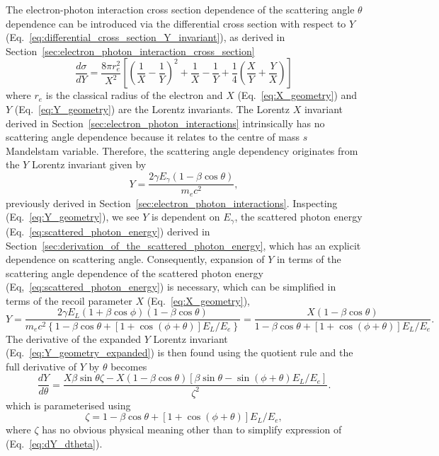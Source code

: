 \documentclass[../main.tex]{subfiles}
\begin{document}
The electron-photon interaction cross section dependence of the scattering angle $\theta$ dependence can be introduced via the differential cross section with respect to $Y$ (Eq.~\ref{eq:differential_cross_section_Y_invariant}), as derived in Section~\ref{sec:electron_photon_interaction_cross_section}
\begin{equation*}
\frac{d\sigma}{dY} = \frac{8\pi r_{e}^{2}}{X^{2}}\left[\left(\frac{1}{X}-\frac{1}{Y}\right)^{2}+\frac{1}{X}-\frac{1}{Y}+\frac{1}{4}\left(\frac{X}{Y}+\frac{Y}{X}\right)\right]
\end{equation*}
where $r_{e}$ is the classical radius of the electron and $X$ (Eq.~\ref{eq:X_geometry}) and $Y$ (Eq.~\ref{eq:Y_geometry}) are the Lorentz invariants. The Lorentz $X$ invariant derived in Section~\ref{sec:electron_photon_interactions} intrinsically has no scattering angle dependence because it relates to the centre of mass $s$ Mandelstam variable. Therefore, the scattering angle dependency originates from the $Y$ Lorentz invariant given by
\begin{equation*}
Y = \frac{2\gamma E_{\gamma}\left(1-\beta\cos\theta\right)}{m_{e}c^{2}},    
\end{equation*}
previously derived in Section~\ref{sec:electron_photon_interactions}. Inspecting (Eq.~\ref{eq:Y_geometry}), we see $Y$ is dependent on $E_{\gamma}$, the scattered photon energy (Eq.~\ref{eq:scattered_photon_energy}) derived in Section~\ref{sec:derivation_of_the_scattered_photon_energy}, which has an explicit dependence on scattering angle. Consequently, expansion of $Y$ in terms of the scattering angle dependence of the scattered photon energy (Eq,~\ref{eq:scattered_photon_energy}) is necessary, which can be simplified in terms of the recoil parameter $X$ (Eq.~\ref{eq:X_geometry}),
\begin{equation}
Y = \frac{2\gamma E_{L}\left(1+\beta\cos\phi\right)\left(1-\beta\cos\theta\right)}{m_{e}c^{2}\left\{1-\beta\cos\theta+\left[1+\cos\left(\phi+\theta\right)\right]E_{L}/E_{e}\right\}} = \frac{X\left(1-\beta\cos\theta\right)}{1-\beta\cos\theta+\left[1+\cos\left(\phi+\theta\right)\right]E_{L}/E_{e}}.
\label{eq:Y_geometry_expanded}
\end{equation}
The derivative of the expanded $Y$ Lorentz invariant (Eq.~\ref{eq:Y_geometry_expanded}) is then found using the quotient rule and the full derivative of $Y$ by $\theta$ becomes
\begin{equation}
\frac{dY}{d\theta} = \frac{X\beta\sin\theta\zeta-X\left(1-\beta\cos\theta\right)\left[\beta\sin\theta-\sin\left(\phi+\theta\right)E_{L}/E_{e}\right]}{\zeta^{2}}.
\label{eq:dY_dtheta}
\end{equation}
which is parameterised using
\begin{equation}
\zeta = 1-\beta\cos\theta+\left[1+\cos\left(\phi+\theta\right)\right]E_{L}/E_{e},
\label{eq:zeta_simplification}
\end{equation}
where $\zeta$ has no obvious physical meaning other than to simplify expression of (Eq.~\ref{eq:dY_dtheta}).
\end{document}
